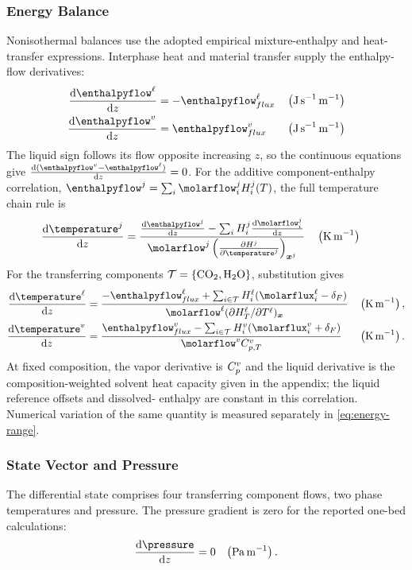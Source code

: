 \subsubsection{Energy Balance}\label{subsubsec:energy-balance}
Nonisothermal balances use the adopted empirical mixture-enthalpy and heat-transfer expressions.
Interphase heat and material transfer supply the enthalpy-flow derivatives:
\begin{align}
\odv{\enthalpyflow^{\liq}}{z} &= -\enthalpyflow^{\liq}_{flux} && \left(\unit{J\,s^{-1}\,m^{-1}}\right)\\
\odv{\enthalpyflow^{\vap}}{z} &= \enthalpyflow^{\vap}_{flux} && \left(\unit{J\,s^{-1}\,m^{-1}}\right)\label{eq:energy-balance}
\end{align}
The liquid sign follows its flow opposite increasing $z$, so the continuous equations give $\odv{(\enthalpyflow^{\vap}-\enthalpyflow^{\liq})}{z}=0$.
For the additive component-enthalpy correlation, $\enthalpyflow^{j}=\sum_i\molarflow_i^{j}H_i^{j}(T)$, the full temperature chain rule is
\begin{align}
\odv{\temperature^j}{z} &= \frac{\odv{\enthalpyflow^j}{z} - \sum_i H_i^j\odv{\molarflow_i^j}{z}}{\molarflow^j \left(\pdv{H^j}{\temperature^j}\right)_{\boldsymbol{x}^j}}
&& \left(\unit{K\,m^{-1}}\right)
\end{align}
For the transferring components \(\mathcal T=\{\COtwo,\HtwoO\}\), substitution gives
\begin{align}
\odv{\temperature^\liq}{z}
&=\frac{-\enthalpyflow^\liq_{flux}+\sum_{i\in\mathcal T}H_i^\liq(\molarflux_i^\liq-\delta_F)}
{\molarflow^\liq(\partial H_T^\liq/\partial T^\liq)_{\boldsymbol{x}}}
&&\left(\unit{K\,m^{-1}}\right),\\
\odv{\temperature^\vap}{z}
&=\frac{\enthalpyflow^\vap_{flux}-\sum_{i\in\mathcal T}H_i^\vap(\molarflux_i^\vap+\delta_F)}
{\molarflow^\vap C_{p,T}^\vap}
&&\left(\unit{K\,m^{-1}}\right).
\end{align}
At fixed composition, the vapor derivative is $C_p^{v}$ and the liquid derivative is the composition-weighted solvent heat capacity given in the appendix; the liquid reference offsets and dissolved-\COtwo{} enthalpy are constant in this correlation.
Numerical variation of the same quantity is measured separately in \cref{eq:energy-range}.

\subsubsection{State Vector and Pressure}
The differential state comprises four transferring component flows, two phase temperatures and pressure.
The pressure gradient is zero for the reported one-bed calculations:
\begin{align}
\odv{\pressure}{z} = 0
&& \left(\unit{Pa\,m^{-1}}\right).
\end{align}

